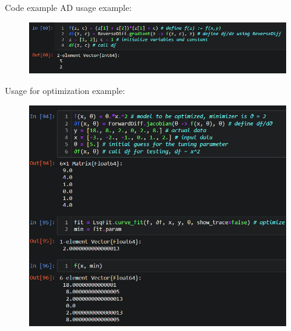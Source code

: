 \documentclass{beamer}
\begin{document}
\begin{frame}{Code example}
\fontsize{7}{6}\selectfont
    AD usage example:
    \begin{figure}[H]
        \centering
            \includegraphics[scale=0.35]{img/slide/autodiff_julia.png}
        \label{fig:reversediff}
    \end{figure}
    
    Usage for optimization example:
    \begin{figure}[H]
        \centering
            \includegraphics[scale=0.27]{img/slide/autodiff_julia_opt.png}
        \label{fig:reversediff}
    \end{figure}
\end{frame}


\end{document}
